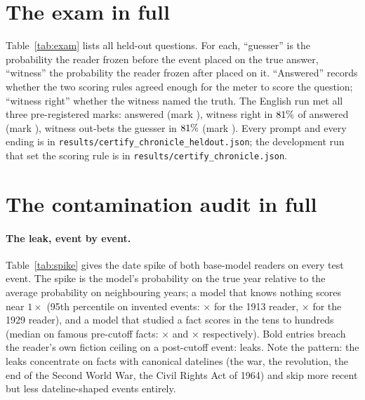 \documentclass[11pt]{article}
\begin{document}
\clearpage
\appendix
\renewcommand{\thesection}{\Alph{section}}

\section{The exam in full}\label{app:exam}
Table~\ref{tab:exam} lists all \NexamTotal{} held-out questions. For each, ``guesser'' is the probability
the reader frozen before the event placed on the true answer, ``witness'' the probability the reader frozen
after placed on it. ``Answered'' records whether the two scoring rules agreed enough for the meter to score
the question; ``witness right'' whether the witness named the truth. The English run met all three
pre-registered marks: \NexamAnswered{} answered (mark \NbarAnswer{}), witness right in $81\%$
of answered (mark \NbarCorrect{}), witness out-bets the guesser in $81\%$ (mark \NbarOutbet{}).
Every prompt and every ending is in \texttt{results/certify\_chronicle\_heldout.json}; the development run
that set the scoring rule is in \texttt{results/certify\_chronicle.json}.

\begin{table}[h]\centering\small

\caption{The held-out certification exam, all \NexamTotal{} questions. Guesser and witness are the bets on
the true answer; a question is ``declined'' when the two scoring rules disagree on the winner.}
\label{tab:exam}
\end{table}

\section{The contamination audit in full}\label{app:audit}

\paragraph{The leak, event by event.} Table~\ref{tab:spike} gives the date spike of both base-model
readers on every test event. The spike is the model's probability on the true year relative to the average
probability on neighbouring years; a model that knows nothing scores near $1\times$ (95th percentile on
invented events: \NspikeNullNinetyFifthThirteen$\times$ for the 1913 reader,
\NspikeNullNinetyFifthTwentyNine$\times$ for the 1929 reader), and a model that studied a fact scores in
the tens to hundreds (median on famous pre-cutoff facts: \NspikeKnownMedThirteen$\times$ and
\NspikeKnownMedTwentyNine$\times$ respectively). Bold entries breach the reader's own fiction ceiling on a
post-cutoff event: leaks. Note the pattern: the leaks concentrate on facts with canonical datelines (the
war, the revolution, the end of the Second World War, the Civil Rights Act of 1964) and skip more recent
but less dateline-shaped events entirely.
\end{document}

